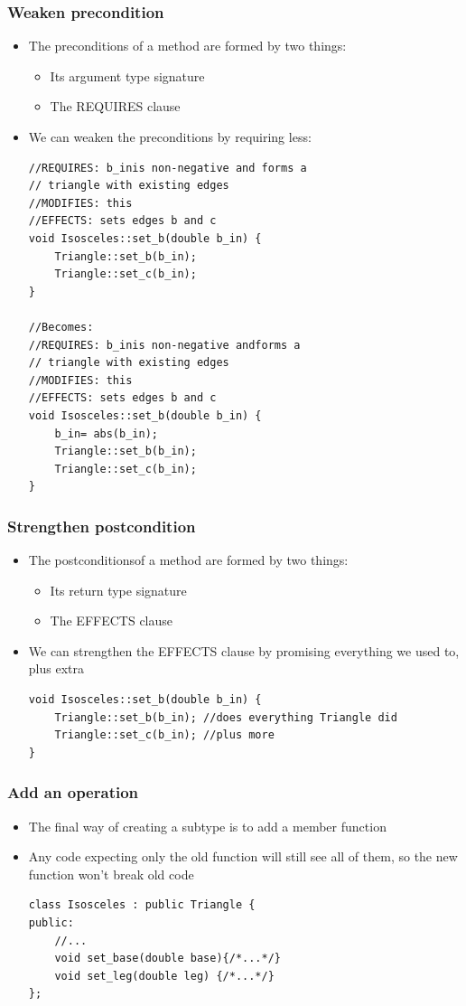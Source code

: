 \subsubsection{Weaken precondition}
\begin{itemize}
	\item The preconditions of a method are formed by two things:
	\begin{itemize}
		\item Its argument type signature
		\item The REQUIRES clause
	\end{itemize}
	\item We can weaken the preconditions by requiring less:
\begin{lstlisting}[style=C++]
//REQUIRES: b_inis non-negative and forms a
// triangle with existing edges
//MODIFIES: this
//EFFECTS: sets edges b and c
void Isosceles::set_b(double b_in) {
	Triangle::set_b(b_in);
	Triangle::set_c(b_in);
}

//Becomes:
//REQUIRES: b_inis non-negative andforms a
// triangle with existing edges
//MODIFIES: this
//EFFECTS: sets edges b and c
void Isosceles::set_b(double b_in) {
	b_in= abs(b_in);
	Triangle::set_b(b_in);
	Triangle::set_c(b_in);
}
\end{lstlisting}
\end{itemize}

\subsubsection{Strengthen postcondition}
\begin{itemize}
	\item The postconditionsof a method are formed by two things:
	\begin{itemize}
		\item Its return type signature
		\item The EFFECTS clause
	\end{itemize}
	\item We can strengthen the EFFECTS clause by promising everything we used to, plus extra
\begin{lstlisting}[style=C++]
void Isosceles::set_b(double b_in) {
	Triangle::set_b(b_in); //does everything Triangle did
	Triangle::set_c(b_in); //plus more
}
\end{lstlisting}
\end{itemize}

\subsubsection{Add an operation}
\begin{itemize}
	\item The final way of creating a subtype is to add a member function
	\item Any code expecting only the old function will still see all of them, so the new function won't break old code
\begin{lstlisting}[style=C++]
class Isosceles : public Triangle {
public:
	//...
	void set_base(double base){/*...*/}
	void set_leg(double leg) {/*...*/}
};
\end{lstlisting}
\end{itemize}